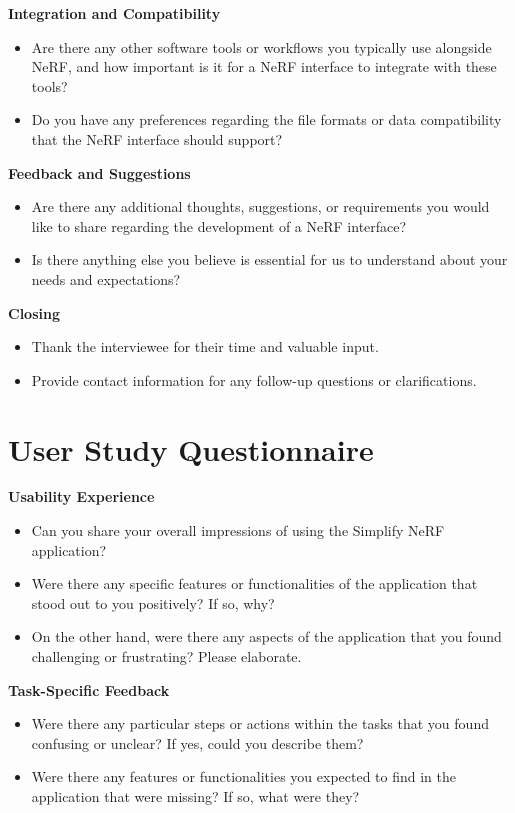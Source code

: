 \textbf{Integration and Compatibility}
\begin{itemize}
\item Are there any other software tools or workflows you typically use alongside NeRF, and how important is it for a NeRF interface to integrate with these tools?
\item Do you have any preferences regarding the file formats or data compatibility that the NeRF interface should support?
\end{itemize}

\textbf{Feedback and Suggestions}
\begin{itemize}
\item Are there any additional thoughts, suggestions, or requirements you would like to share regarding the development of a NeRF interface?
\item Is there anything else you believe is essential for us to understand about your needs and expectations?
\end{itemize}

\textbf{Closing}
\begin{itemize}
\item Thank the interviewee for their time and valuable input.
\item Provide contact information for any follow-up questions or clarifications.
\end{itemize}

\section{User Study Questionnaire}
\label{sec:appendix:questionnaire}

\textbf{Usability Experience}
\begin{itemize}
\item Can you share your overall impressions of using the Simplify NeRF application?
\item Were there any specific features or functionalities of the application that stood out to you positively? If so, why?
\item On the other hand, were there any aspects of the application that you found challenging or frustrating? Please elaborate.
\end{itemize}

\textbf{Task-Specific Feedback}
\begin{itemize}
\item Were there any particular steps or actions within the tasks that you found confusing or unclear? If yes, could you describe them?
\item Were there any features or functionalities you expected to find in the application that were missing? If so, what were they?
\end{itemize}

